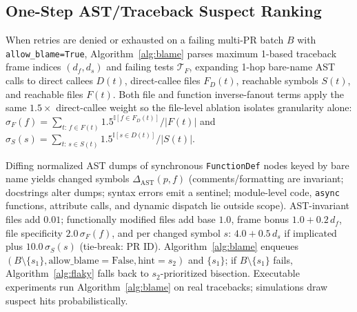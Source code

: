 \subsection{One-Step AST/Traceback Suspect Ranking}
When retries are denied or exhausted on a failing multi-PR batch $B$ with \texttt{allow\_blame=True}, Algorithm~\ref{alg:blame} parses maximum 1-based traceback frame indices $(d_f, d_s)$ and failing tests $\mathcal{T}_F$, expanding 1-hop bare-name AST calls to direct callees $D(t)$, direct-callee files $F_D(t)$, reachable symbols $S(t)$, and reachable files $F(t)$. Both file and function inverse-fanout terms apply the same $1.5\times$ direct-callee weight so the file-level ablation isolates granularity alone: $\sigma_F(f)=\sum_{t:\, f\in F(t)} 1.5^{\mathbb{I}[f\in F_D(t)]}/|F(t)|$ and $\sigma_S(s)=\sum_{t:\, s\in S(t)} 1.5^{\mathbb{I}[s\in D(t)]}/|S(t)|$.

Diffing normalized AST dumps of synchronous \texttt{FunctionDef} nodes keyed by bare name yields changed symbols $\Delta_{\text{AST}}(p, f)$ (comments/formatting are invariant; docstrings alter dumps; syntax errors emit a sentinel; module-level code, \texttt{async} functions, attribute calls, and dynamic dispatch lie outside scope). AST-invariant files add $0.01$; functionally modified files add base $1.0$, frame bonus $1.0+0.2\,d_f$, file specificity $2.0\,\sigma_F(f)$, and per changed symbol $s$: $4.0+0.5\,d_s$ if implicated plus $10.0\,\sigma_S(s)$ (tie-break: PR ID). Algorithm~\ref{alg:blame} enqueues $(B\setminus\{s_1\}, \text{allow\_blame}=\text{False}, \text{hint}=s_2)$ and $\{s_1\}$; if $B\setminus\{s_1\}$ fails, Algorithm~\ref{alg:flaky} falls back to $s_2$-prioritized bisection. Executable experiments run Algorithm~\ref{alg:blame} on real tracebacks; simulations draw suspect hits probabilistically.

